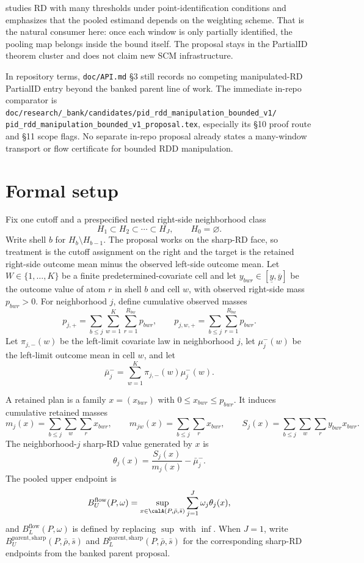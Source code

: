 \documentclass[11pt]{article}
\theoremstyle{definition}
\theoremstyle{plain}
\theoremstyle{remark}
\begin{document}
\citet{Bertanha2020} studies RD with many thresholds under point-identification conditions and emphasizes
that the pooled estimand depends on the weighting scheme.  That is the natural consumer here: once each
window is only partially identified, the pooling map belongs inside the bound itself.  The proposal stays in
the PartialID theorem cluster and does not claim new SCM infrastructure.

In repository terms, \texttt{doc/API.md} \S3 still records no competing manipulated-RD PartialID entry
beyond the banked parent line of work.  The immediate in-repo comparator is
\texttt{doc/research/\_bank/candidates/pid\_rdd\_manipulation\_bounded\_v1/}
\texttt{pid\_rdd\_manipulation\_bounded\_v1\_proposal.tex}, especially its \S10 proof route and \S11 scope
flags.  No separate in-repo proposal already states a many-window transport or flow certificate for bounded
RDD manipulation.

\section{Formal setup}
Fix one cutoff and a prespecified nested right-side neighborhood class
\[
  H_1\subset H_2\subset\cdots\subset H_J,
  \qquad H_0=\varnothing.
\]
Write shell \(b\) for \(H_b\setminus H_{b-1}\).  The proposal works on the sharp-RD face, so treatment is
the cutoff assignment on the right and the target is the retained right-side outcome mean minus the observed
left-side outcome mean.  Let \(W\in\{1,\ldots,K\}\) be a finite predetermined-covariate cell and let
\(y_{bwr}\in[\underline y,\overline y]\) be the outcome value of atom \(r\) in shell \(b\) and cell \(w\),
with observed right-side mass \(p_{bwr}>0\).  For neighborhood \(j\), define cumulative observed masses
\[
  p_{j,+}=\sum_{b\le j}\sum_{w=1}^K\sum_{r=1}^{R_{bw}} p_{bwr},
  \qquad
  p_{j,w,+}=\sum_{b\le j}\sum_{r=1}^{R_{bw}} p_{bwr}.
\]
Let \(\pi_{j,-}(w)\) be the left-limit covariate law in neighborhood \(j\), let \(\mu^-_j(w)\) be the
left-limit outcome mean in cell \(w\), and let
\[
  \bar\mu^-_j=\sum_{w=1}^K \pi_{j,-}(w)\mu^-_j(w).
\]

A retained plan is a family \(x=(x_{bwr})\) with \(0\le x_{bwr}\le p_{bwr}\).  It induces cumulative
retained masses
\[
  m_j(x)=\sum_{b\le j}\sum_w\sum_r x_{bwr},
  \qquad
  m_{jw}(x)=\sum_{b\le j}\sum_r x_{bwr},
  \qquad
  S_j(x)=\sum_{b\le j}\sum_w\sum_r y_{bwr}x_{bwr}.
\]
The neighborhood-\(j\) sharp-RD value generated by \(x\) is
\[
  \theta_j(x)=\frac{S_j(x)}{m_j(x)}-\bar\mu^-_j.
\]
The pooled upper endpoint is
\[
  B_U^{\mathrm{flow}}(P,\omega)=
  \sup_{x\in\calA(P,\bar\rho,\bar s)}
  \sum_{j=1}^J \omega_j\theta_j(x),
\]
and \(B_L^{\mathrm{flow}}(P,\omega)\) is defined by replacing \(\sup\) with \(\inf\).
When \(J=1\), write \(B_U^{\mathrm{parent,sharp}}(P,\bar\rho,\bar s)\) and
\(B_L^{\mathrm{parent,sharp}}(P,\bar\rho,\bar s)\) for the corresponding sharp-RD endpoints from the
banked parent proposal.
\end{document}
